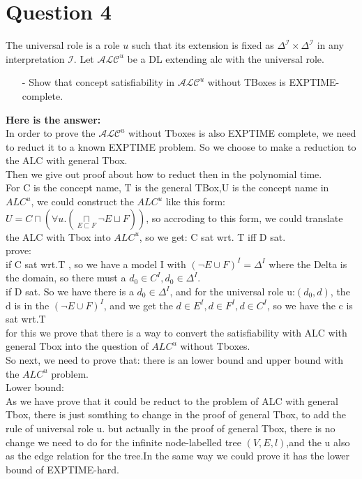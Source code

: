 \documentclass{article}
\begin{document}
    \section{Question 4}
    The universal role is a role $u$ such that its extension is fixed as $\Delta^{\mathcal{I}}\times\Delta^{\mathcal{I}}$ in any
    interpretation $\mathcal{I}$. Let $\mathcal{ALC}^{u}$ be a DL extending alc with the universal role. 
    \begin{itemize}
        \item[-] Show that concept satisfiability in $\mathcal{ALC}^{u}$ without TBoxes is EXPTIME-complete.
    \end{itemize}
    \textbf{Here is the answer:}\\
    In order to prove the $\mathcal{ALC}^{u}$ without Tboxes is also EXPTIME complete, we need to reduct it to a known EXPTIME problem. So we choose to make a reduction to the ALC with general Tbox.\\
    Then we give out proof about how to reduct then in the polynomial time.\\
    For C is the concept name, T is the general TBox,U is the concept name in $ALC^u$, we could construct the $ALC^u$ like this form:\\
    $U = C \sqcap (\forall u.(\underset{E \sqsubset F}{\sqcap} \neg E \sqcup F))$, so accroding to this form, we could translate the ALC with Tbox into $ALC^u$, so we get: C sat wrt. T iff D sat.\\
    prove:\\
    if C sat wrt.T , so we have a model I with $(\neg E \cup F)^I = \Delta^I$ where the Delta is the domain, so there must a $d_0 \in C^I, d_0 \in \Delta^I$. \\
    if D sat. So we have there is a $d_0 \in \Delta^I$, and for the universal role u:$(d_0, d)$, the d is in the $(\neg E \cup F)^I$, and we get the $d \in E^I, d\in F^I,d \in C^I$, so we have the c is sat wrt.T\\
    for this we prove that there is a way to convert the satisfiability with ALC with general Tbox into the question of $ALC^u$ without Tboxes.\\
    
    So next, we need to prove that: there is an lower bound and upper bound with the $ALC^u$ problem.\\
    
    Lower bound:\\
    As we have prove that it could be reduct to the problem of ALC with general Tbox, there is just somthing to change in the proof of general Tbox, to add the rule of universal role u.
    but actually in the proof of general Tbox, there is no change we need to do for the infinite node-labelled tree $(V,E,l)$,and the u also as the edge relation for the tree.In the same way we could prove it has 
    the lower bound of EXPTIME-hard.\\
\end{document}
